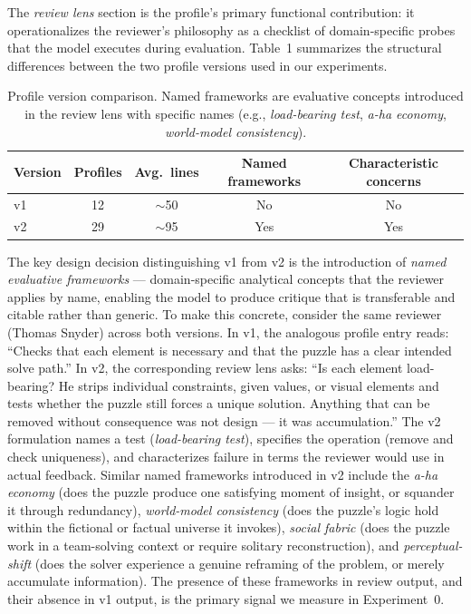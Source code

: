 The \emph{review lens} section is the profile's primary functional contribution: it operationalizes the reviewer's philosophy as a checklist of domain-specific probes that the model executes during evaluation. Table~1 summarizes the structural differences between the two profile versions used in our experiments.

\begin{table}[h]
\centering
\caption{Profile version comparison. Named frameworks are evaluative concepts introduced in the review lens with specific names (e.g., \emph{load-bearing test}, \emph{a-ha economy}, \emph{world-model consistency}).}
\begin{tabular}{lcccc}
\hline
Version & Profiles & Avg.\ lines & Named frameworks & Characteristic concerns \\
\hline
v1 & 12 & $\sim$50 & No & No \\
v2 & 29 & $\sim$95 & Yes & Yes \\
\hline
\end{tabular}
\label{tab:profiles}
\end{table}

The key design decision distinguishing v1 from v2 is the introduction of \emph{named evaluative frameworks} --- domain-specific analytical concepts that the reviewer applies by name, enabling the model to produce critique that is transferable and citable rather than generic. To make this concrete, consider the same reviewer (Thomas Snyder) across both versions. In v1, the analogous profile entry reads: ``Checks that each element is necessary and that the puzzle has a clear intended solve path.'' In v2, the corresponding review lens asks: ``Is each element load-bearing? He strips individual constraints, given values, or visual elements and tests whether the puzzle still forces a unique solution. Anything that can be removed without consequence was not design --- it was accumulation.'' The v2 formulation names a test (\emph{load-bearing test}), specifies the operation (remove and check uniqueness), and characterizes failure in terms the reviewer would use in actual feedback. Similar named frameworks introduced in v2 include the \emph{a-ha economy} (does the puzzle produce one satisfying moment of insight, or squander it through redundancy), \emph{world-model consistency} (does the puzzle's logic hold within the fictional or factual universe it invokes), \emph{social fabric} (does the puzzle work in a team-solving context or require solitary reconstruction), and \emph{perceptual-shift} (does the solver experience a genuine reframing of the problem, or merely accumulate information). The presence of these frameworks in review output, and their absence in v1 output, is the primary signal we measure in Experiment~0.

